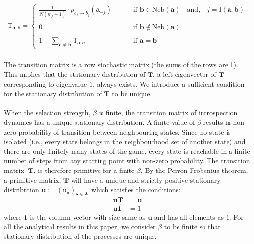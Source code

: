 \documentclass[11pt]{article}
\theoremstyle{plainCl1}
\newtheorem{Prop}{Proposition}
\theoremstyle{plainCl2}
\newcommand{\A}{\mathbf{A}}
\newcommand{\abf}{\mathbf{a}}
\newcommand{\bbf}{\mathbf{b}}
\newcommand{\cbf}{\mathbf{c}}
\newcommand{\T}{\mathbf{T}}
\newcommand{\ubf}{\mathbf{u}}
\begin{document}
\begin{align}
\mathrm{T}_{\abf, \bbf} = 
\begin{cases}
\frac{1}{N(m_j-1)}  \cdot p_{a_{j} \to b_{j}} (\abf_{-j}) \quad  \quad &\text{ if }\bbf \in \mathrm{Neb}(\abf) \quad \text{and,} \quad j = \mathrm{I}(\abf,\bbf)\\ \\ 
0 \quad &\text{ if } \bbf \notin \mathrm{Neb}(\abf) \\ \\
1 - \sum_{\cbf \neq \bbf} \mathrm{T}_{\abf,\cbf} \quad &\text{ if } \abf = \bbf
\end{cases}
\label{Eq:transition-matrix}
\end{align} \\ 
\noindent The transition matrix is a row stochastic matrix (the sums of the rows are 1). This implies that the stationary distribution of $\T$, a left eigenvector of $\T$ corresponding to eigenvalue $1$, always exists. We introduce a sufficient condition for the stationary distribution of $\T$ to be unique. 
\\ \\
\noindent When the selection strength, $\beta$ is finite, the transition matrix of introspection dynamics has a unique stationary distribution. A finite value of $\beta$ results in non-zero probability of transition between neighbouring states. Since no state is isolated (i.e., every state belongs in the neighbourhood set of another state) and there are only finitely many states of the game, every state is reachable in a finite number of steps from any starting point with non-zero probability. The transition matrix, $\T$, is therefore primitive for a finite $\beta$. By the Perron-Frobenius theorem, a primitive matrix, $\T$ will have a unique and strictly positive stationary distribution $\ubf := (\mathrm{u}_\abf)_{\abf \in \A}$ which satisfies the conditions: 
\begin{eqnarray}
\label{Eq:lefteigenvector}
\ubf \T &= \ubf \\ 
\label{Eq:normalizationcondition}
\ubf \mathbf{1} &= 1
\end{eqnarray}
\noindent where $\mathbf{1}$ is the column vector with size same as $\ubf$ and has all elements as $1$. For all the analytical results in this paper, we consider $\beta$ to be finite so that stationary distribution of the processes are unique. \\ \\
\end{document}

